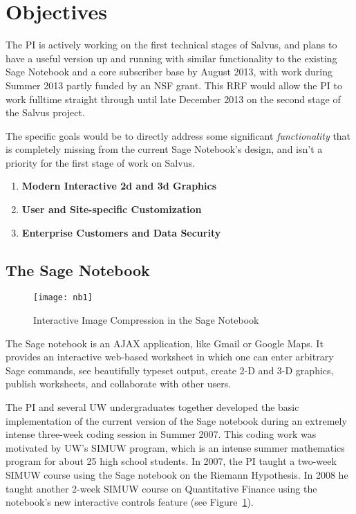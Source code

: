 \documentclass[11pt]{article}
\begin{document}
\section{Objectives}

The PI is actively working on the first technical stages of Salvus,
and plans to have a useful version up and running with similar
functionality to the existing Sage Notebook and a core subscriber base
by August 2013, with work during Summer 2013 partly funded by an NSF
grant.  This RRF would allow the PI to work fulltime straight through
until late December 2013 on the second stage of the Salvus project.

The specific goals would be to directly address some significant {\em
  functionality} that is completely missing from the current Sage
Notebook's design, and isn't a priority for the first stage of work on
Salvus.

\begin{enumerate}
\item {\bf Modern Interactive 2d and 3d Graphics}

\item {\bf User and Site-specific Customization}

\item {\bf Enterprise Customers and Data Security}

\end{enumerate}


\subsection{The Sage Notebook}
\begin{figure}
\begin{center}
\texttt{[image: nb1]}
\caption{Interactive Image Compression in the Sage Notebook\label{fig:interact}}
\end{center}
\end{figure}
The Sage notebook is an AJAX application, like Gmail or Google Maps.
It provides an interactive web-based worksheet in which one can enter
arbitrary Sage commands, see beautifully typeset output, create 2-D
and 3-D graphics, publish worksheets, and collaborate with other
users.

The PI and several UW undergraduates together developed the basic
implementation of the current version of the Sage notebook during an
extremely intense three-week coding session in Summer 2007.  This coding
work was motivated by UW's SIMUW program, which is an intense summer
mathematics program for about 25 high school students.  In 2007, the
PI taught a two-week SIMUW course using the Sage notebook on the Riemann
Hypothesis.  In 2008 he taught another 2-week SIMUW course on
Quantitative Finance using the notebook's new interactive controls
feature (see Figure~\ref{fig:interact}).
\end{document}
